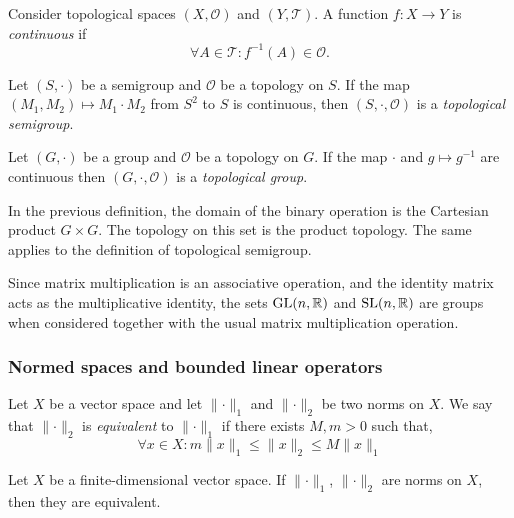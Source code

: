 \begin{definition}
	Consider topological spaces $(X, \mathcal{O})$ and $(Y, \mathcal{T})$. A function $f : X \to Y$ is \textit{continuous} if
	\[
	\forall A \in \mathcal{T} : f^{-1}(A) \in \mathcal{O}.
	\]
\end{definition}

\begin{definition}
	Let $(S, \cdot)$ be a semigroup and $\mathcal{O}$ be a topology on $S$. If the map $(M_1, M_2) \mapsto M_1 \cdot M_2$ from $S^2$ to $S$ is continuous, then $(S, \cdot, \mathcal{O})$ is a \textit{topological semigroup}.
\end{definition}

\begin{definition}
	Let $(G, \cdot)$ be a group and $\mathcal{O}$ be a topology on $G$. If the map $\cdot$ and $g \mapsto g^{-1}$ are continuous then $(G, \cdot, \mathcal{O} )$ is a \textit{topological group}.
\end{definition}

\begin{note}
	In the previous definition, the domain of the binary operation is the Cartesian product $G \times G$. The topology on this set is the product topology. The same applies to the definition of topological semigroup.
\end{note}

\begin{example}
	Since matrix multiplication is an associative operation, and the identity matrix acts as the multiplicative identity, the sets $\operatorname{GL}(n, \mathbb{R})$ and $\operatorname{SL}(n, \mathbb{R})$ are groups when considered together with the usual matrix multiplication operation.
\end{example}

\subsubsection{Normed spaces and bounded linear operators}

\begin{definition}
	Let $X$ be a vector space and let $\lVert \cdot \rVert_1$ and $\lVert \cdot \rVert_2$ be two norms on $X$. We say that $\lVert \cdot \rVert_2$ is \textit{equivalent} to $\lVert \cdot \rVert_1$ if there exists $M, m > 0$ such that,
	\[
	\forall x \in X: m \lVert x \rVert_1 \leq \lVert x \rVert_2 \leq M \lVert x \rVert_1
	\]
\end{definition}

\begin{proposition}
	Let $X$ be a finite-dimensional vector space. If $\lVert \cdot \rVert_1$, $\lVert \cdot \rVert_2$ are norms on $X$, then they are equivalent.
\end{proposition}

